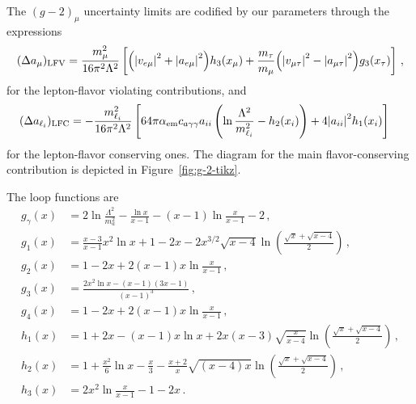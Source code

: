 \documentclass[prd,amsfonts,onecolumn,superscriptaddress,aps,nofootinbib,11pt]{revtex4-1}
\begin{document}
The $(g-2)_{\mu}$ uncertainty limits are codified by our parameters through the expressions
\begin{equation}
\label{eq:g-2}
        (\Delta a_\mu)_{\rm{LFV}} = \frac{m_\mu^2}{16 \pi^2 \Lambda^2} \left[ \qty(\abs{v_{e\mu}}^2+ \abs{a_{e\mu}}^2)h_3(x_\mu) + \frac{m_\tau}{m_\mu} \qty( \abs{v_{\mu \tau}}^2 - \abs{a_{\mu \tau}}^2)g_3(x_\tau)  \right] \,,
\end{equation}
for the lepton-flavor violating contributions, and
\begin{equation}
    \begin{split}
        (\Delta a_{\ell_i})_{\rm{LFC}} &=  -\frac{m_{\ell_i}^2}{16 \pi^2 \Lambda^2} \left[ 64\pi \alpha_{\mathrm{em}} c_{a \gamma \gamma} a_{ii} \left(\ln \frac{\Lambda^2}{m_{\ell_i}^2} - h_2(x_i) \right) + 4 \abs{a_{ii}}^2 h_1(x_i)  \right]
    \end{split}
\end{equation}
for the lepton-flavor conserving ones. The diagram for the main flavor-conserving contribution is depicted in Figure~\ref{fig:g-2-tikz}.

The loop functions are
\begin{equation}
    \begin{split}
        g_\gamma(x) &= 2 \ln \frac{\Lambda^2}{m_a^2} - \frac{\ln x}{x - 1} - (x-1) \ln \frac{x}{x-1} - 2 \,,\\
        g_1(x) &= \frac{x-3}{x-1}x^2 \ln x + 1 -2x - 2 x^{3/2} \sqrt{x-4} \ln \left( \frac{\sqrt{x}+ \sqrt{x-4}}{2} \right) \,, \\
        g_2(x) &= 1 - 2x + 2(x-1)x \ln \frac{x}{x-1} \,, \\
        g_3(x) &= \frac{2x^2 \ln x - (x-1)(3x-1)}{(x-1)^3} \,, \\
        g_4(x) &= 1 - 2x + 2(x-1)x \ln \frac{x}{x-1}  \,, \\
        h_1(x) &= 1 + 2x - (x-1)x \ln x + 2x(x-3)\sqrt{\frac{x}{x-4}} \ln \left( \frac{\sqrt{x}+ \sqrt{x-4}}{2} \right) \,, \\
        h_2(x) &= 1 + \frac{x^2}{6} \ln x - \frac{x}{3} - \frac{x+2}{x}\sqrt{(x-4)x} \ln \left( \frac{\sqrt{x}+ \sqrt{x-4}}{2} \right) \,, \\
        h_3(x) &= 2x^2 \ln \frac{x}{x-1} -1 -2x\,.
    \end{split}
\end{equation}
\end{document}
